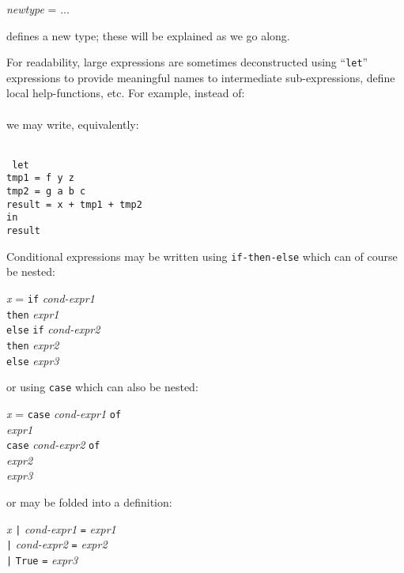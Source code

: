 \documentclass[11pt]{article}
\newcommand{\hmm}{\hspace*{2em}}
\newcommand{\hmmm}{\hspace*{3em}}
\newcommand{\hmmmm}{\hspace*{4em}}
\begin{document}
\hmmm {\tt data} \emph{newtype} = ...

defines a new type; these will be explained as we go along.

For readability, large expressions are sometimes deconstructed using
``{\tt let}'' expressions to provide meaningful names to intermediate
sub-expressions, define local help-functions, etc. For example,
instead of: \\
\hmmmm{\tt x + f y z - g a b c} \\
we may write, equivalently: \\
\hmmmm \
\begin{minipage}[t]{4in}\tt
let \\
\hmm tmp1 = f y z \\
\hmm tmp2 = g a b c \\
\hmm result = x + tmp1 + tmp2 \\
in \\
\hmm result
\end{minipage}

Conditional expressions may be written using \verb|if-then-else| which can of course be nested:
\begin{tabbing}
\hmmm \= \emph{x} = \= {\tt if} \emph{cond-expr1} \\
      \>            \> {\tt then} \emph{expr1} \\
      \>            \> {\tt else} \= {\tt if} \emph{cond-expr2} \\
      \>            \>            \> {\tt then} \emph{expr2} \\
      \>            \>            \> {\tt else} \emph{expr3}
\end{tabbing}
or using \verb|case| which can also be nested:
\begin{tabbing}
\hmmm \= \emph{x} = \= {\tt case} \emph{cond-expr1} {\tt of}\\
      \>            \> \hmm {\tt True -> } \emph{expr1} \\
      \>            \> \hmm {\tt False ->} \= {\tt case} \emph{cond-expr2} {\tt of}\\
      \>            \>                     \> \hmm {\tt True ->} \emph{expr2} \\
      \>            \>                     \> \hmm {\tt False ->} \emph{expr3}
\end{tabbing}
or may be folded into a definition:
\begin{tabbing}
\hmmm \= \emph{x} \= {\tt |} \emph{cond-expr1} \= {\tt =} \emph{expr1} \\
      \>          \> {\tt |} \emph{cond-expr2} \> {\tt =} \emph{expr2} \\
      \>          \> {\tt |} {\tt True}        \> {\tt =} \emph{expr3}
\end{tabbing}
\end{document}
